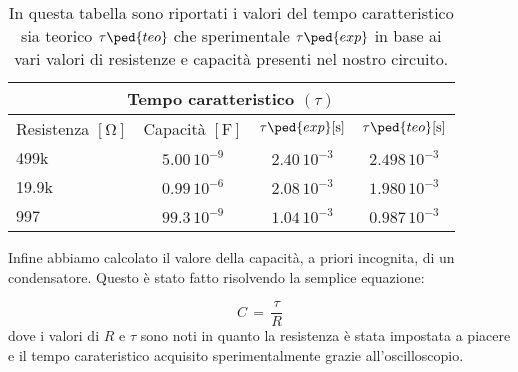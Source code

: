 \begin{table}[H]
  \centering
  \begin{tabular}{l | c c c}
      \multicolumn{4}{c}{\textbf{Tempo caratteristico $(\tau)$}} \\
      \toprule
      Resistenza $[\si{\ohm}]$ & Capacità $[\si{\farad}]$ & $\tau\ped{exp} [\si{\second}]$ & $\tau\ped{teo} [\si{\second}]$ \\
      \midrule
      499k   &  $5.00\,10^{-9}$ 	& $2.40\,10^{-3}$ 	& $2.498\,10^{-3}$ \\
      19.9k  &  $0.99\,10^{-6}$ 	& $2.08\,10^{-3}$ 	& $1.980\,10^{-3}$ \\
      997    &  $99.3\,10^{-9}$ 	& $1.04\,10^{-3}$ 	& $0.987\,10^{-3}$ \\
      \bottomrule
  \end{tabular}
  \caption{In questa tabella sono riportati i valori del tempo caratteristico sia teorico $\tau\ped{teo}$ che sperimentale $\tau\ped{exp}$ in base ai vari valori di resistenze e capacità presenti nel nostro circuito.}
\end{table}

Infine abbiamo calcolato il valore della capacità, a priori incognita, di un condensatore. Questo è stato fatto risolvendo la semplice equazione:

\begin{equation}
	C \,=\, \frac{\tau}{R}
\end{equation}
%
dove i valori di $R$ e $\tau$ sono noti in quanto la resistenza è stata impostata a piacere e il tempo carateristico acquisito sperimentalmente grazie all'oscilloscopio.
